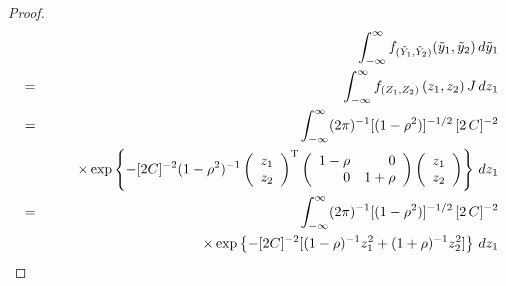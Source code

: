 \documentclass[a4paper]{article}
\theoremstyle{myexamplestyle}
\begin{document}
\begin{proof}
\begin{eqnarray*}
& & \hspace{-1.5cm}
\int_{-\infty}^{\infty} f_{(\tilde{Y}_1, \tilde{Y}_2)} (\tilde{y}_1, \tilde{y}_2)\, d\tilde{y}_1
\\
& = & \int_{-\infty}^{\infty} f_{(Z_1, Z_2)} \, (z_1, z_2) \, J \, dz_1
\\
& = & \int_{-\infty}^{\infty} (2 \pi)^{-1} [(1-\rho^2)]^{-1/2} \, [2 \, C]^{-2}
\\
& & \qquad \times 
\exp \left\{
- [  2 C ]^{-2} (1-\rho^2)^{-1} 
\left(
\begin{array}{r}
z_1 \\ z_2
\end{array}
\right)^{\mathrm{T}}
\left(
\begin{array}{rr}
1-\rho & 0
\\
0 & 1 + \rho 
\end{array}
\right)
\left(
\begin{array}{r}
z_1 \\ z_2
\end{array}
\right)
\right\} \, d z_1
\\
& = & \int_{-\infty}^{\infty} (2 \pi)^{-1} [(1-\rho^2)]^{-1/2} \, [2 \, C]^{-2}
\\
& & \qquad \times \exp \left\{ -[  2 C ]^{-2} [ (1-\rho)^{-1} z_1^2 + (1+\rho)^{-1} z_2^2]  \right\} \, d z_1

\end{eqnarray*}
\end{proof}
\end{document}
